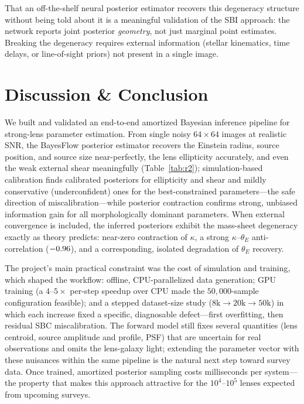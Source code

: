 \documentclass[11pt,a4paper]{article}
\begin{document}
That an off-the-shelf neural posterior estimator recovers this degeneracy
structure without being told about it is a meaningful validation of the SBI
approach: the network reports joint posterior \emph{geometry}, not just marginal
point estimates. Breaking the degeneracy requires external information (stellar
kinematics, time delays, or line-of-sight priors) not present in a single image.

\section{Discussion \& Conclusion}

We built and validated an end-to-end amortized Bayesian inference pipeline for
strong-lens parameter estimation. From single noisy $64\times64$ images at
realistic SNR, the BayesFlow posterior estimator recovers the Einstein radius,
source position, and source size near-perfectly, the lens ellipticity accurately,
and even the weak external shear meaningfully (Table~\ref{tab:r2});
simulation-based calibration finds calibrated posteriors for ellipticity and
shear and mildly conservative (underconfident) ones for the best-constrained
parameters---the safe direction of miscalibration---while posterior contraction
confirms strong, unbiased information gain for all morphologically dominant
parameters. When external convergence is included, the
inferred posteriors exhibit the mass-sheet degeneracy exactly as theory predicts:
near-zero contraction of $\kappa$, a strong $\kappa$--$\theta_E$ anti-correlation
($-0.96$), and a corresponding, isolated degradation of $\theta_E$ recovery.

The project's main practical constraint was the cost of simulation and training,
which shaped the workflow: offline, CPU-parallelized data generation; GPU training
(a $4$--$5\times$ per-step speedup over CPU made the $50{,}000$-sample
configuration feasible); and a stepped dataset-size study
($8\mathrm{k} \to 20\mathrm{k} \to 50\mathrm{k}$) in which each increase fixed a
specific, diagnosable defect---first overfitting, then residual SBC
miscalibration. The forward model still fixes several quantities (lens centroid,
source amplitude and profile, PSF) that are uncertain for real observations and
omits the lens-galaxy light; extending the parameter vector with these nuisances
within the same pipeline is the natural next step toward survey data. Once
trained, amortized posterior sampling costs milliseconds per system---the property
that makes this approach attractive for the $10^4$--$10^5$ lenses expected from
upcoming surveys.
\end{document}
